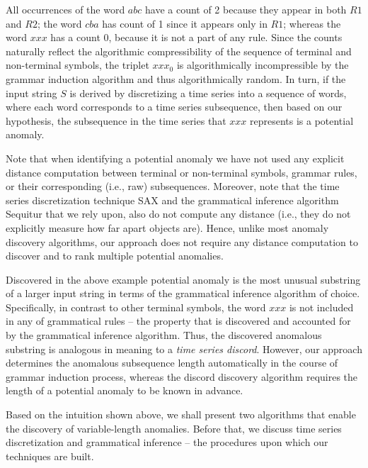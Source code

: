 \documentclass{sig-alternate}
\begin{document}
All occurrences of the word $abc$ have a count of 2 because they appear in both $R1$ and $R2$; the word $cba$ has count of 1 since it appears only in $R1$; whereas the word $xxx$ has a count 0, because it is not a part of any rule. Since the counts naturally reflect the algorithmic compressibility of the sequence of terminal and non-terminal symbols, the triplet $xxx_{0}$ is algorithmically incompressible by the grammar induction algorithm and thus algorithmically random. In turn, if the input string $S$ is derived by discretizing a time series into a sequence of words, where each word corresponds to a time series subsequence, then based on our hypothesis, the subsequence in the time series that $xxx$ represents is a potential anomaly.

Note that when identifying a potential anomaly we have not used any explicit distance computation between terminal or non-terminal symbols, grammar rules, or their corresponding (i.e., raw) subsequences. Moreover, note that the time series discretization technique SAX \cite{sax} and the grammatical inference algorithm Sequitur \cite{sequitur} that we rely upon, also do not compute any distance (i.e., they do not explicitly measure how far apart objects are). Hence, unlike most anomaly discovery algorithms, our approach does not require any distance computation to discover and to rank multiple potential anomalies. 

Discovered in the above example potential anomaly is the most unusual substring of a larger input string in terms of the grammatical inference algorithm of choice. Specifically, in contrast to other terminal symbols, the word $xxx$ is not included in any of grammatical rules -- the property that is discovered and accounted for by the grammatical inference algorithm. Thus, the discovered anomalous substring is analogous in meaning to a \textit{time series discord}. However, our approach determines the anomalous subsequence length automatically in the course of grammar induction process, whereas the discord discovery algorithm requires the length of a potential anomaly to be known in advance. 

Based on the intuition shown above, we shall present two algorithms that enable the discovery of variable-length anomalies. Before that, we discuss time series discretization and grammatical inference -- the procedures upon which our techniques are built.
\end{document}
